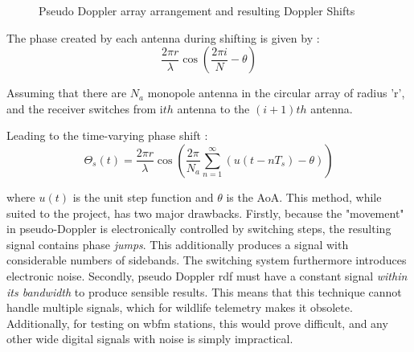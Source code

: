\documentclass[class=report,11pt,crop=false]{standalone}
\begin{document}
\begin{figure}[h]\centering
    \caption{Pseudo Doppler array arrangement and resulting Doppler Shifts \cite{pd-thesis}}
    \label{fig:pd geometry}
\end{figure}

The phase created by each antenna during shifting is given by \cite{pd-thesis}:
\begin{equation}
    \frac{2 \pi r}{\lambda} \cos{(\frac{2 \pi i}{N} - \theta)}
\end{equation}

Assuming that there are $N_a$ monopole antenna in the circular array of radius ’r’, and the receiver switches from i$th$ antenna to the $(i + 1)th$ antenna.

Leading to the time-varying phase shift \cite{pd-thesis}:
\begin{equation}
    \Theta_s(t) = \frac{2 \pi r}{\lambda} \cos{(\frac{2\pi}{N_a} \sum_{n=1}^{\infty} (u(t-nT_s) - \theta))}
\end{equation}

where $u(t)$ is the unit step function and $\theta$ is the \gls{AoA}.
This method, while suited to the project, has two major drawbacks. Firstly, because the "movement" in pseudo-Doppler is electronically controlled by switching steps, the resulting signal contains phase \emph{jumps}. This additionally produces a signal with considerable numbers of sidebands. \cite{pd-sidebands}  The switching system furthermore introduces electronic noise. 
Secondly,  pseudo Doppler \gls{rdf} must have a constant signal \emph{within its bandwidth} to produce sensible results. This means that this technique cannot handle multiple signals, which for wildlife telemetry makes it obsolete. Additionally, for testing on \gls{wbfm} stations, this would prove difficult, and any other wide digital signals with noise is simply impractical.
\end{document}
